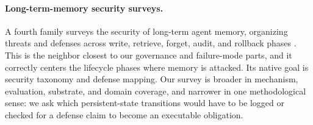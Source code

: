 \paragraph{Long-term-memory security surveys.} A fourth family surveys the security of long-term agent memory, organizing threats and defenses across write, retrieve, forget, audit, and rollback phases \citep{lin2026surveylongtermmemorysecurity}. This is the neighbor closest to our governance and failure-mode parts, and it correctly centers the lifecycle phases where memory is attacked. Its native goal is security taxonomy and defense mapping. Our survey is broader in mechanism, evaluation, substrate, and domain coverage, and narrower in one methodological sense: we ask which persistent-state transitions would have to be logged or checked for a defense claim to become an executable obligation.

